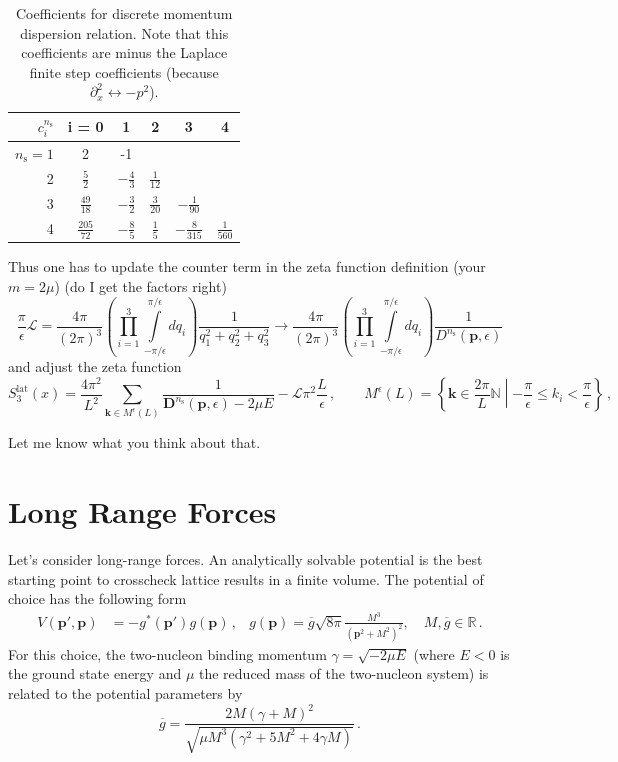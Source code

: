 \documentclass[
    aps,
    prl,
    showkeys,
    nofootinbib,
    floatfix
]{revtex4-1}
\renewcommand{\vec}[1]{\boldsymbol{#1}}
\begin{document}
\begin{table}[htb]
\centering
\begin{tabular}{r | ccccc}
$ c_{i}^{n_{\mathrm{s}}}$ & i = 0 & 1 & 2 & 3 & 4 \\ \hline
$n_{\mathrm{s}} = 1$ & 2 & -1 \\
2 & $\frac{5}{2}$ & $-\frac{4}{3}$ & $\frac{1}{12}$ \\
3 & $\frac{49}{18}$ & $-\frac{3}{2}$ & $\frac{3}{20}$ & $-\frac{1}{90}$ \\
4 & $\frac{205}{72}$ & $-\frac{8}{5}$ & $\frac{1}{5}$  & $-\frac{8}{315}$ & $\frac{1}{560}$
\end{tabular}
\caption{\label{tab-dispersion-coeff}Coefficients for discrete momentum dispersion relation.
    Note that this coefficients are minus the Laplace finite step coefficients (because $\partial_x^2 \leftrightarrow - p^2$).
}
\end{table}

Thus one has to update the counter term in the zeta function definition (your $m = 2\mu$) (do I get the factors right)
\begin{equation}
    \frac{\pi}{\epsilon}
    \mathcal L
    =
    \frac{4 \pi}{(2\pi)^3}
    \left(
    \prod \limits_{i=1}^3
    \int\limits_{-\pi /\epsilon}^{\pi / \epsilon}
    d q_i
    \right)
    \frac{1}{q_1^2 + q_2^2 + q_3^2}
    \to
    \frac{4 \pi}{(2\pi)^3}
    \left(
    \prod \limits_{i=1}^3
    \int\limits_{-\pi / \epsilon}^{\pi / \epsilon}
    d q_i
    \right)
    \frac{1}{D^{n_{\mathrm{s}}}(\vec p, \epsilon)}
\end{equation}
and adjust the zeta function
\begin{equation}
    S_3^{\mathrm{lat}}(x) = \frac{4 \pi^2}{L^2} \sum\limits_{\vec k \in M^\epsilon(L)} \frac{1}{\vec D^{n_{\mathrm{s}}}(\vec p, \epsilon) - 2 \mu E} - \mathcal L \pi^2 \frac{L}{\epsilon}
    \, , \qquad
    M^\epsilon(L) = \left\{ \vec k \in \frac{2 \pi}{L} \mathbb N \middle\vert - \frac{\pi}{\epsilon} \leq k_i < \frac{\pi}{\epsilon} \right\}
    \, ,
\end{equation}

Let me know what you think about that.

\newpage
\section{Long Range Forces}
Let's consider long-range forces.
An analytically solvable potential is the best starting point to crosscheck lattice results in a finite volume.
The potential of choice has the following form
\begin{align}
	V(\vec p', \vec p) &= - g^*(\vec p') g(\vec p) \, ,
	&
	g(\vec{p})=\overline{g} \sqrt{8 \pi} \frac{M^{3}}{\left(\vec{p}^{2}+M^{2}\right)^{2}}, \quad M, \overline{g} \in \mathbb{R}
	\, .
\end{align}
For this choice, the two-nucleon binding momentum $\gamma = \sqrt{-2 \mu E}$ (where $E < 0$ is the ground state energy and $\mu$ the reduced mass of the two-nucleon system) is related to the potential parameters by
\begin{equation}
	\overline{g} = \frac{2M(\gamma+M)^{2}}{\sqrt{\mu M^{3}\left(\gamma^{2}+5 M^{2}+4 \gamma M\right)}} \, .
\end{equation}
\end{document}
